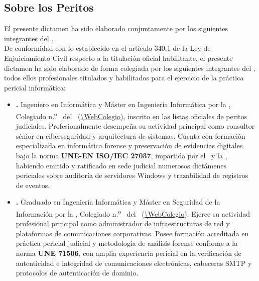 \subsection{Sobre los Peritos}

El presente dictamen ha sido elaborado conjuntamente por los siguientes integrantes del \textbf{\GrupoPracticas}.\\
De conformidad con lo establecido en el artículo 340.1 de la Ley de Enjuiciamiento Civil respecto a la titulación oficial habilitante, el presente dictamen ha sido elaborado de forma colegiada por los siguientes integrantes del \textbf{\GrupoPracticas}, todos ellos profesionales titulados y habilitados para el ejercicio de la práctica pericial informática:

\begin{itemize}[leftmargin=1.4em, itemsep=0.6em]
	\item \begin{sloppypar}
		\textbf{\PeritoUno.} Ingeniero en Informática y Máster en Ingeniería Informática por la \UniversidadPerito, Colegiado n.\textsuperscript{o} \NumColegiadoUno\ del \ColegioProfesional\ (\url{\WebColegio}), inscrito en las listas oficiales de peritos judiciales. Profesionalmente desempeña su actividad principal como consultor sénior en ciberseguridad y arquitectura de sistemas. Cuenta con formación especializada en informática forense y preservación de evidencias digitales bajo la norma \textbf{UNE-EN ISO/IEC 27037}, impartida por el \ColegioProfesional\ y la \UniversidadPerito, habiendo emitido y ratificado en sede judicial numerosos dictámenes periciales sobre auditoría de servidores Windows y trazabilidad de registros de eventos.
	\end{sloppypar}
	
	\item \begin{sloppypar}
		\textbf{\PeritoDos.} Graduado en Ingeniería Informática y Máster en Seguridad de la Información por la \UniversidadPerito, Colegiado n.\textsuperscript{o} \NumColegiadoDos\ del \ColegioProfesional\ (\url{\WebColegio}). Ejerce su actividad profesional principal como administrador de infraestructuras de red y plataformas de comunicaciones corporativas. Posee formación acreditada en práctica pericial judicial y metodología de análisis forense conforme a la norma \textbf{UNE 71506}, con amplia experiencia pericial en la verificación de autenticidad e integridad de comunicaciones electrónicas, cabeceras SMTP y protocolos de autenticación de dominio.
	\end{sloppypar}
	

\end{itemize}
